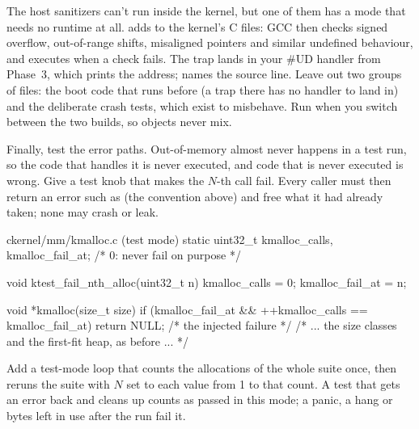 \documentclass[11pt,a4paper]{article}
\begin{document}
The host sanitizers can't run inside the kernel, but one of them has a mode that needs no runtime at all.
 adds  to the kernel's C files:
GCC then checks signed overflow, out-of-range shifts, misaligned pointers and similar undefined behaviour, and
executes  when a check fails. The trap lands in your \#UD handler from Phase~3, which prints the address;
 names the source line. Leave out two groups of files: the boot code that
runs before  (a trap there has no handler to land in) and the deliberate crash tests, which exist to
misbehave. Run  when you switch between the two builds, so objects never mix.


Finally, test the error paths. Out-of-memory almost never happens in a test run, so the code that handles it is never
executed, and code that is never executed is wrong. Give  a test knob that makes the $N$-th call fail.
Every caller must then return an error such as  (the convention above) and free what it had already
taken; none may crash or leak.

\begin{lst}{c}{kernel/mm/kmalloc.c (test mode)}
static uint32_t kmalloc_calls, kmalloc_fail_at;       /* 0: never fail on purpose */

void ktest_fail_nth_alloc(uint32_t n) { kmalloc_calls = 0; kmalloc_fail_at = n; }

void *kmalloc(size_t size)
{
    if (kmalloc_fail_at && ++kmalloc_calls == kmalloc_fail_at)
        return NULL;                                  /* the injected failure */
    /* ... the size classes and the first-fit heap, as before ... */
}
\end{lst}
Add a test-mode loop that counts the allocations of the whole suite once, then reruns the suite with $N$ set to each
value from 1 to that count. A test that gets an error back and cleans up counts as passed in this mode; a panic, a
hang or bytes left in use after the run fail it.
\end{document}
